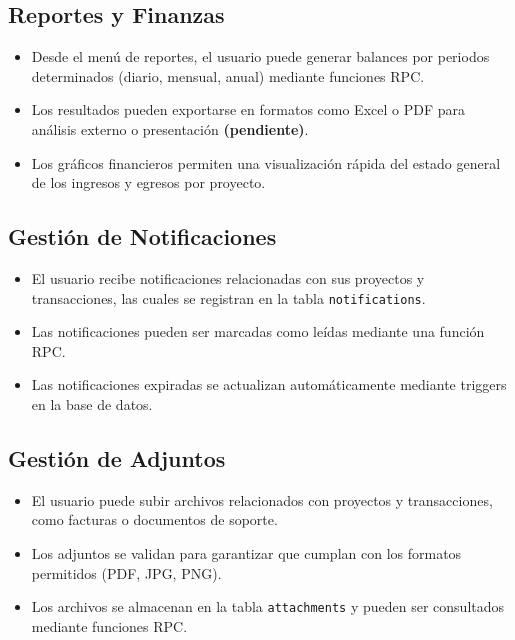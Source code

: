 \subsection*{Reportes y Finanzas}
\begin{itemize}
    \item Desde el menú de reportes, el usuario puede generar balances por periodos determinados (diario, mensual, anual) mediante funciones RPC.
    \item Los resultados pueden exportarse en formatos como Excel o PDF para análisis externo o presentación \textbf{(pendiente)}.
    \item Los gráficos financieros permiten una visualización rápida del estado general de los ingresos y egresos por proyecto.
\end{itemize}

\subsection*{Gestión de Notificaciones}
\begin{itemize}
    \item El usuario recibe notificaciones relacionadas con sus proyectos y transacciones, las cuales se registran en la tabla \texttt{notifications}.
    \item Las notificaciones pueden ser marcadas como leídas mediante una función RPC.
    \item Las notificaciones expiradas se actualizan automáticamente mediante triggers en la base de datos.
\end{itemize}

\subsection*{Gestión de Adjuntos}
\begin{itemize}
    \item El usuario puede subir archivos relacionados con proyectos y transacciones, como facturas o documentos de soporte.
    \item Los adjuntos se validan para garantizar que cumplan con los formatos permitidos (PDF, JPG, PNG).
    \item Los archivos se almacenan en la tabla \texttt{attachments} y pueden ser consultados mediante funciones RPC.
\end{itemize}